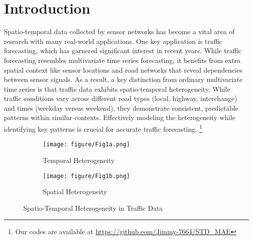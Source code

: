 \documentclass[letterpaper]{article} \usepackage{aaai24}  \usepackage{times}  \usepackage{helvet}  \usepackage{courier}  \usepackage[hyphens]{url}  \usepackage{graphicx} \urlstyle{rm} \def\UrlFont{\rm}  \usepackage{natbib}  \usepackage{caption} \frenchspacing  \setlength{\pdfpagewidth}{8.5in} \setlength{\pdfpageheight}{11in} \usepackage{algorithm}
\begin{document}
\section{Introduction}
Spatio-temporal data collected by sensor networks has become a vital area of research with many real-world applications. One key application is traffic forecasting, which has garnered significant interest in recent years. While traffic forecasting resembles multivariate time series forecasting, it benefits from extra spatial context like sensor locations and road networks that reveal dependencies between sensor signals. As a result, a key distinction from ordinary multivariate time series is that traffic data exhibits spatio-temporal heterogeneity. While traffic conditions vary across different road types (local, highway, interchange) and times (weekday versus weekend), they demonstrate consistent, predictable patterns within similar contexts. Effectively modeling the heterogeneity while identifying key patterns is crucial for accurate traffic forecasting.
\footnote{Our codes are available at \url{https://github.com/Jimmy-7664/STD_MAE}}
\begin{figure}[t]
  \centering
  \begin{subfigure}{1\linewidth}
    \texttt{[image: figure/Fig1a.png]}
    \caption{Temporal Heterogeneity}
    \label{fig1-sub1}
  \end{subfigure}
  \begin{subfigure}{1\linewidth}
    \texttt{[image: figure/Fig1b.png]}
    \caption{Spatial Heterogeneity}
    \label{fig1-sub2}
  \end{subfigure}
  \caption{Spatio-Temporal Heterogeneity in Traffic Data}
  \label{fig1}
\end{figure}
\end{document}
